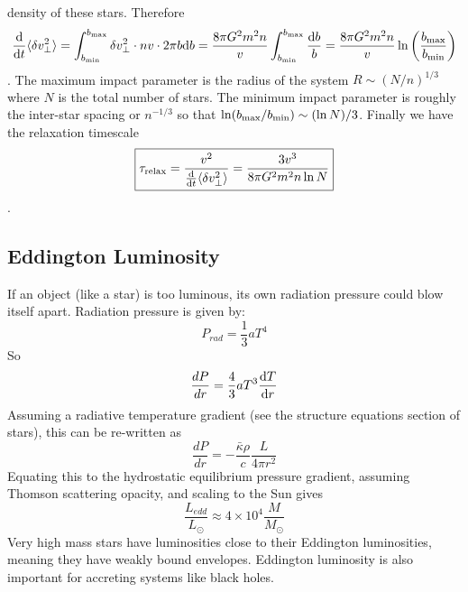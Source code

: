 density of these stars.  Therefore
\begin{dmath*}
    \frac{\d}{\d t} \langle\delta v_\perp^2\rangle
        = \int_{b_{\rm min}}^{b_{\rm max}} \delta v_\perp^2 \cdot nv \cdot 2\pi b\d b
        = \frac{8\pi G^2m^2n}{v}\int_{b_{\rm min}}^{b_{\rm max}} \frac{\d b}{b}
        = \frac{8\pi G^2m^2n}{v} \ln\left(\frac{b_{\rm max}}{b_{\rm min}}\right)
\end{dmath*}.
The maximum impact parameter is the radius of the system $R\sim(N/n)^{1/3}$ where
$N$ is the total number of stars.  The minimum impact parameter is roughly the
inter-star spacing or $n^{-1/3}$ so that $\ln(b_{\rm max}/b_{\rm min}) \sim (\ln N)/3$.
Finally we have the relaxation timescale
\begin{dmath}\boxed{
    \tau_{\rm relax} = \frac{v^2}{\frac{\d}{\d t}\langle\delta v_\perp^2\rangle} \nolinebreak
                     = \frac{3v^3}{8\pi G^2m^2n\ln N}
}\end{dmath}.

\subsection{Eddington Luminosity}
If an object (like a star) is too luminous, its own radiation pressure could 
blow itself apart.  Radiation pressure is given by:
\begin{equation}
P_{rad}=\frac{1}{3}aT^4
\end{equation}
So
\begin{equation}
\frac{dP}{dr}=\frac{4}{3}aT^3\frac{{\rm d} T}{{\rm d} r}
\end{equation}
Assuming a radiative temperature gradient (see the structure equations section 
of stars), this can be re-written as
\begin{equation}
\frac{dP}{dr}=-\frac{\bar{\kappa}\rho}{c}\frac{L}{4\pi r^2}
\end{equation}
Equating this to the hydrostatic equilibrium pressure gradient, assuming 
Thomson scattering opacity, and scaling to the Sun gives
\begin{equation}
\boxed{\frac{L_{edd}}{L_{\odot}}\approx 4\times10^4\frac{M}{M_{\odot}}}
\end{equation}
Very high mass stars have luminosities close to their Eddington luminosities, 
meaning they have weakly bound envelopes.  Eddington luminosity is also 
important for accreting systems like black holes.  

